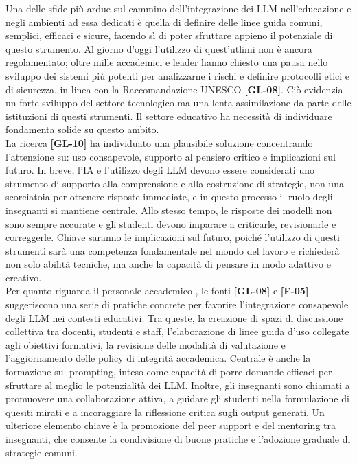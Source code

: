 \documentclass[a4paper,9pt]{article}
\begin{document}
Una delle sfide più ardue sul cammino dell'integrazione dei LLM nell'educazione e negli ambienti ad essa dedicati è quella di definire delle linee guida comuni, semplici, efficaci e sicure, facendo sì di poter sfruttare appieno il potenziale di questo strumento. Al giorno d'oggi l'utilizzo di quest'utlimi non è ancora regolamentato; oltre mille accademici e leader hanno chiesto una pausa nello sviluppo dei sistemi più potenti per analizzarne i rischi e definire protocolli etici e di sicurezza, in linea con la Raccomandazione UNESCO \textbf{[GL-08]}. Ciò evidenzia un forte sviluppo del settore tecnologico ma una lenta assimilazione da parte delle istituzioni di questi strumenti. Il settore educativo ha necessità di individuare fondamenta solide su questo ambito.\\
La ricerca \textbf{[GL-10]} ha individuato una plausibile soluzione concentrando l'attenzione su: uso consapevole, supporto al pensiero critico e implicazioni sul futuro. In breve, l'IA e l'utilizzo degli LLM devono essere considerati uno strumento di supporto alla comprensione e alla costruzione di strategie, non una scorciatoia per ottenere risposte immediate, e in questo processo il ruolo degli insegnanti si mantiene centrale. Allo stesso tempo, le risposte dei modelli non sono sempre accurate e gli studenti devono imparare a criticarle, revisionarle e correggerle. Chiave saranno le implicazioni sul futuro, poiché l'utilizzo di questi strumenti sarà una competenza fondamentale nel mondo del lavoro e richiederà non solo abilità tecniche, ma anche la capacità di pensare in modo adattivo e creativo.\\
Per quanto riguarda il personale accademico , le fonti \textbf{[GL-08]} e \textbf{[F-05]} suggeriscono una serie di pratiche concrete per favorire l’integrazione consapevole degli LLM nei contesti educativi. Tra queste, la creazione di spazi di discussione collettiva tra docenti, studenti e staff, l’elaborazione di linee guida d’uso collegate agli obiettivi formativi, la revisione delle modalità di valutazione e l’aggiornamento delle policy di integrità accademica. Centrale è anche la formazione sul prompting, inteso come capacità di porre domande efficaci per sfruttare al meglio le potenzialità dei LLM. Inoltre, gli insegnanti sono chiamati a promuovere una collaborazione attiva, a guidare gli studenti nella formulazione di quesiti mirati e a incoraggiare la riflessione critica sugli output generati. Un ulteriore elemento chiave è la promozione del peer support e del mentoring tra insegnanti, che consente la condivisione di buone pratiche e l’adozione graduale di strategie comuni.\\ 
\end{document}
